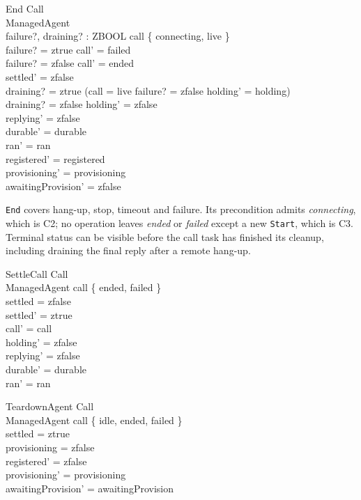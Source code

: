\documentclass[a4paper,10pt,fleqn]{article}
\begin{document}
\begin{schema}{End}
  \Delta Call \\
  \Delta ManagedAgent \\
  failure?, draining? : ZBOOL
\where
  call \in \{ connecting, live \} \\
  failure? = ztrue \implies call' = failed \\
  failure? = zfalse \implies call' = ended \\
  settled' = zfalse \\
  draining? = ztrue \implies
    (call = live \land failure? = zfalse \land holding' = holding) \\
  draining? = zfalse \implies holding' = zfalse \\
  replying' = zfalse \\
  durable' = durable \\
  ran' = ran \\
  registered' = registered \\
  provisioning' = provisioning \\
  awaitingProvision' = zfalse
\end{schema}

\texttt{End} covers hang-up, stop, timeout and failure. Its precondition
admits \emph{connecting}, which is C2; no operation leaves \emph{ended} or
\emph{failed} except a new \texttt{Start}, which is C3. Terminal status
can be visible before the call task has finished its cleanup, including
draining the final reply after a remote hang-up.

\begin{schema}{SettleCall}
  \Delta Call \\
  \Xi ManagedAgent
\where
  call \in \{ ended, failed \} \\
  settled = zfalse \\
  settled' = ztrue \\
  call' = call \\
  holding' = zfalse \\
  replying' = zfalse \\
  durable' = durable \\
  ran' = ran
\end{schema}

\begin{schema}{TeardownAgent}
  \Xi Call \\
  \Delta ManagedAgent
\where
  call \in \{ idle, ended, failed \} \\
  settled = ztrue \\
  provisioning = zfalse \\
  registered' = zfalse \\
  provisioning' = provisioning \\
  awaitingProvision' = awaitingProvision
\end{schema}
\end{document}
